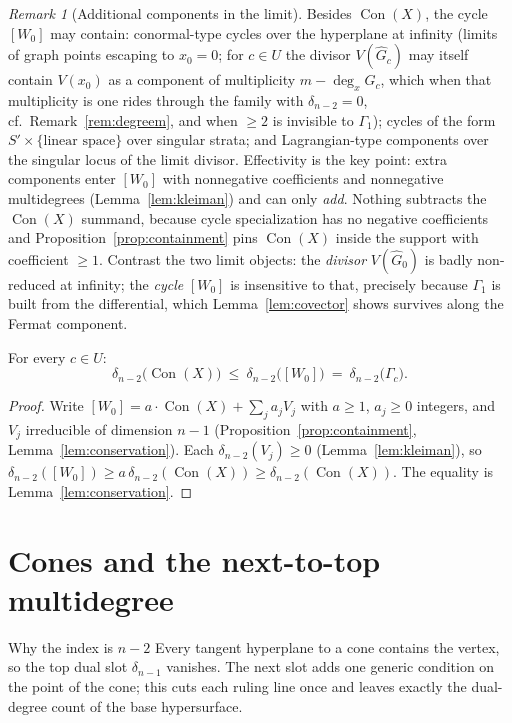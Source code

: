\documentclass[acmsmall,screen,nonacm]{acmart}
\theoremstyle{definition}
\theoremstyle{remark}
\newtheorem{remark}{Remark}[section]
\DeclareMathOperator{\Con}{Con}
\newcommand{\pdeg}{\delta}
\newcommand{\Gone}{\Gamma_{\!1}}
\begin{document}
\begin{remark}[Additional components in the limit]\label{rem:extra}
Besides $\Con(X)$, the cycle $[W_0]$ may contain: conormal-type cycles
over the hyperplane at infinity (limits of graph points escaping to
$x_0=0$; for $c\in U$ the divisor $V(\widehat G_c)$ may itself contain
$V(x_0)$ as a component of multiplicity $m-\deg_xG_c$, which when that
multiplicity is one rides through the family with
$\pdeg_{n-2}=0$, cf.\ Remark~\ref{rem:degreem}, and when $\ge2$ is
invisible to $\Gone$); cycles of the form
$S'\times\{\text{linear space}\}$ over singular strata; and
Lagrangian-type components over the singular locus of the limit
divisor.  Effectivity is the key point: extra components enter
$[W_0]$ with nonnegative coefficients and nonnegative multidegrees
(Lemma~\ref{lem:kleiman}) and can only \emph{add}.  Nothing subtracts
the $\Con(X)$ summand, because cycle specialization has no negative
coefficients and Proposition~\ref{prop:containment} pins $\Con(X)$
inside the support with coefficient $\ge1$.  Contrast the two limit
objects: the \emph{divisor} $V(\widehat G_0)$ is badly non-reduced at
infinity; the \emph{cycle} $[W_0]$ is insensitive to that, precisely
because $\Gone$ is built from the differential, which
Lemma~\ref{lem:covector} shows survives along the Fermat component.
\end{remark}

\begin{corollary}\label{cor:specialgeneric}
For every $c\in U$:
\[
  \pdeg_{n-2}\big(\Con(X)\big)\ \le\ \pdeg_{n-2}\big([W_0]\big)
  \ =\ \pdeg_{n-2}\big(\Gamma_c\big).
\]
\end{corollary}

\begin{proof}
Write $[W_0]=a\cdot\Con(X)+\sum_ja_jV_j$ with $a\ge1$, $a_j\ge0$
integers, and $V_j$ irreducible of dimension $n-1$
(Proposition~\ref{prop:containment},
Lemma~\ref{lem:conservation}).  Each $\pdeg_{n-2}(V_j)\ge0$
(Lemma~\ref{lem:kleiman}), so
$\pdeg_{n-2}([W_0])\ge a\,\pdeg_{n-2}(\Con(X))
\ge\pdeg_{n-2}(\Con(X))$.  The equality is
Lemma~\ref{lem:conservation}.
\end{proof}

\section{Cones and the next-to-top multidegree}
\label{sec:coneshift}

\begin{readerbox}{Why the index is $n-2$}
Every tangent hyperplane to a cone contains the vertex, so the top dual slot $\pdeg_{n-1}$ vanishes.  The next slot adds one generic condition on the point of the cone; this cuts each ruling line once and leaves exactly the dual-degree count of the base hypersurface.
\end{readerbox}
\end{document}
